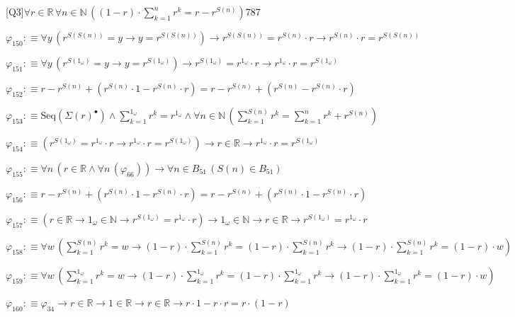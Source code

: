 \begin{fullproof}{[Q3]}{$\forall r \in \mathbb{R}\,\forall n \in \mathbb{N}\,((1 - r) \cdot {\textstyle\sum_{k=1}^{n} {{r}^{k}}} = r - {{r}^{S(n)}})$}{787}
\begin{abbrevlist}
\item $\varphi_{150} :\equiv \forall y\,({{r}^{S(S(n))}} = y \to y = {{r}^{S(S(n))}}) \to {{r}^{S(S(n))}} = {{r}^{S(n)}} \cdot r \to {{r}^{S(n)}} \cdot r = {{r}^{S(S(n))}}$
\item $\varphi_{151} :\equiv \forall y\,({{r}^{S(1_{\omega})}} = y \to y = {{r}^{S(1_{\omega})}}) \to {{r}^{S(1_{\omega})}} = {{r}^{1_{\omega}}} \cdot r \to {{r}^{1_{\omega}}} \cdot r = {{r}^{S(1_{\omega})}}$
\item $\varphi_{152} :\equiv r - {{r}^{S(n)}} + ({{r}^{S(n)}} \cdot 1 - {{r}^{S(n)}} \cdot r) = r - {{r}^{S(n)}} + ({{r}^{S(n)}} - {{r}^{S(n)}} \cdot r)$
\item $\varphi_{153} :\equiv \mathrm{Seq}(\Sigma {(r)^{\bullet}}) \land {\textstyle\sum_{k=1}^{1_{\omega}} {{r}^{k}}} = {{r}^{1_{\omega}}} \land \forall n \in \mathbb{N}\,({\textstyle\sum_{k=1}^{S(n)} {{r}^{k}}} = {\textstyle\sum_{k=1}^{n} {{r}^{k}}} + {{r}^{S(n)}})$
\item $\varphi_{154} :\equiv ({{r}^{S(1_{\omega})}} = {{r}^{1_{\omega}}} \cdot r \to {{r}^{1_{\omega}}} \cdot r = {{r}^{S(1_{\omega})}}) \to r \in \mathbb{R} \to {{r}^{1_{\omega}}} \cdot r = {{r}^{S(1_{\omega})}}$
\item $\varphi_{155} :\equiv \forall n\,(r \in \mathbb{R} \land \forall n\,(\varphi_{66})) \to \forall n \in B_{51}\,(S(n) \in B_{51})$
\item $\varphi_{156} :\equiv r - {{r}^{S(n)}} + ({{r}^{S(n)}} \cdot 1 - {{r}^{S(n)}} \cdot r) = r - {{r}^{S(n)}} + ({{r}^{S(n)}} \cdot 1 - {{r}^{S(n)}} \cdot r)$
\item $\varphi_{157} :\equiv (r \in \mathbb{R} \to 1_{\omega} \in \mathbb{N} \to {{r}^{S(1_{\omega})}} = {{r}^{1_{\omega}}} \cdot r) \to 1_{\omega} \in \mathbb{N} \to r \in \mathbb{R} \to {{r}^{S(1_{\omega})}} = {{r}^{1_{\omega}}} \cdot r$
\item $\varphi_{158} :\equiv \forall w\,({\textstyle\sum_{k=1}^{S(n)} {{r}^{k}}} = w \to (1 - r) \cdot {\textstyle\sum_{k=1}^{S(n)} {{r}^{k}}} = (1 - r) \cdot {\textstyle\sum_{k=1}^{S(n)} {{r}^{k}}} \to (1 - r) \cdot {\textstyle\sum_{k=1}^{S(n)} {{r}^{k}}} = (1 - r) \cdot w)$
\item $\varphi_{159} :\equiv \forall w\,({\textstyle\sum_{k=1}^{1_{\omega}} {{r}^{k}}} = w \to (1 - r) \cdot {\textstyle\sum_{k=1}^{1_{\omega}} {{r}^{k}}} = (1 - r) \cdot {\textstyle\sum_{k=1}^{1_{\omega}} {{r}^{k}}} \to (1 - r) \cdot {\textstyle\sum_{k=1}^{1_{\omega}} {{r}^{k}}} = (1 - r) \cdot w)$
\item $\varphi_{160} :\equiv \varphi_{34} \to r \in \mathbb{R} \to 1 \in \mathbb{R} \to r \in \mathbb{R} \to r \cdot 1 - r \cdot r = r \cdot (1 - r)$

\end{abbrevlist}
\end{fullproof}
